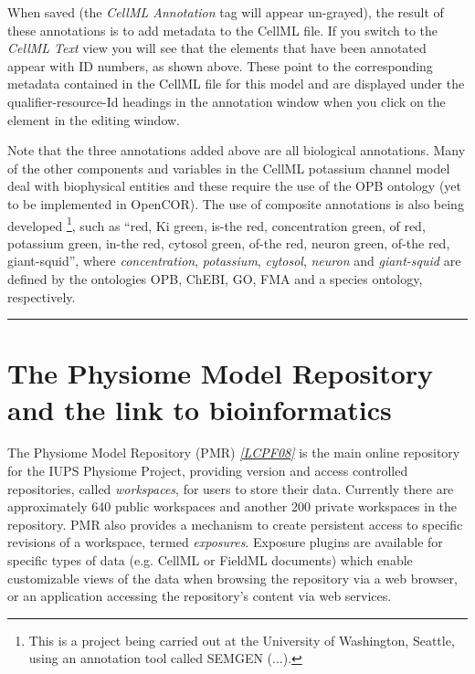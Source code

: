 \documentclass[a4paper,10pt,english]{sphinxmanual}
\renewcommand{\DUspan}[2]{#1, #2}
\begin{document}
When saved (the \emph{CellML Annotation} tag will appear un-grayed), the
result of these annotations is to add metadata to the CellML file. If
you switch to the \emph{CellML Text} view you will see that the elements that
have been annotated appear with ID numbers, as shown above.
These point to the corresponding metadata contained in the CellML file
for this model and are displayed under the qualifier-resource-Id
headings in the annotation window when you click on the element in the
editing window.

Note that the three annotations added above are all biological
annotations. Many of the other components and variables in the CellML
potassium channel model deal with biophysical entities and these require
the use of the OPB ontology (yet to be implemented in OpenCOR). The use
of composite annotations is also being developed \footnote[8]{
This is a project being carried out at the University of Washington, Seattle, using an annotation tool called SEMGEN (...).
}, such as
“\DUspan{red}{Ki} \DUspan{green}{is-the} \DUspan{red}{concentration} \DUspan{green}{of} \DUspan{red}{potassium} \DUspan{green}{in-the}
\DUspan{red}{cytosol} \DUspan{green}{of-the} \DUspan{red}{neuron} \DUspan{green}{of-the} \DUspan{red}{giant-squid}”, where \emph{concentration},
\emph{potassium}, \emph{cytosol}, \emph{neuron} and \emph{giant-squid} are defined by the
ontologies OPB, ChEBI, GO, FMA and a species ontology, respectively.


\bigskip\hrule{}\bigskip



\chapter{The Physiome Model Repository and the link to bioinformatics}
\label{pmr::doc}\label{pmr:the-physiome-model-repository-and-the-link-to-bioinformatics}
The Physiome Model Repository (PMR) \label{pmr:id1}{\hyperref[zreferences:id10]{\emph{{[}LCPF08{]}}}} is the main online repository
for the IUPS Physiome Project, providing version and access controlled
repositories, called \emph{workspaces}, for users to store their data.
Currently there are approximately 640 public workspaces and another 200
private workspaces in the repository. PMR also provides a mechanism to
create persistent access to specific revisions of a workspace, termed
\emph{exposures}. Exposure plugins are available for specific types of data
(e.g. CellML or FieldML documents) which enable customizable views of
the data when browsing the repository via a web browser, or an
application accessing the repository’s content via web services.
\end{document}
